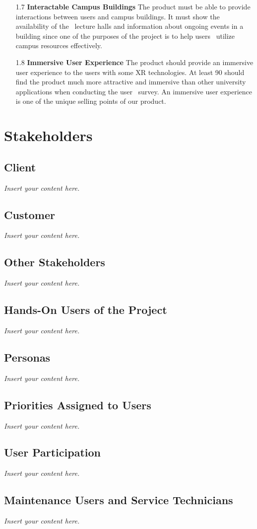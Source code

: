 \documentclass[12pt]{article}
\newcommand{\lips}{\textit{Insert your content here.}}
\begin{document}
\begin{itemize}
  \item[1.7] \textbf{Interactable Campus Buildings}
  The product must be able to provide interactions between users and campus buildings. It must show the availability of the \
  lecture halls and information about ongoing events in a building since one of the purposes of the project is to help users \
  utilize campus resources effectively.

  \item[1.8] \textbf{Immersive User Experience}
  The product should provide an immersive user experience to the users with some XR technologies. At least 90%
  should find the product much more attractive and immersive than other university applications when conducting the user \
  survey. An immersive user experience is one of the unique selling points of our product.

\end{itemize}

\section{Stakeholders}
\subsection{Client}
\lips
\subsection{Customer}
\lips
\subsection{Other Stakeholders}
\lips
\subsection{Hands-On Users of the Project}
\lips
\subsection{Personas}
\lips
\subsection{Priorities Assigned to Users}
\lips
\subsection{User Participation}
\lips
\subsection{Maintenance Users and Service Technicians}
\lips
\end{document}
